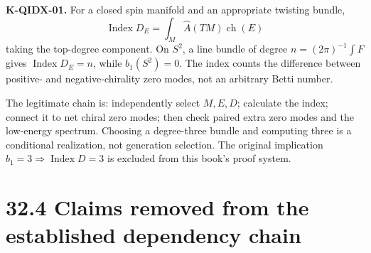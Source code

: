 \documentclass[
  11pt,
  oneside]{book}
\begin{document}
\textbf{K-QIDX-01.} For a closed spin manifold and an appropriate
twisting bundle, \[
\operatorname{Index}D_E=\int_M\widehat A(TM)\operatorname{ch}(E)
\] taking the top-degree component. On \(S^2\), a line bundle of degree
\(n=(2\pi)^{-1}\int F\) gives \(\operatorname{Index}D_E=n\), while
\(b_1(S^2)=0\). The index counts the difference between positive- and
negative-chirality zero modes, not an arbitrary Betti number.

The legitimate chain is: independently select \(M,E,D\); calculate the
index; connect it to net chiral zero modes; then check paired extra zero
modes and the low-energy spectrum. Choosing a degree-three bundle and
computing three is a conditional realization, not generation selection.
The original implication \(b_1=3\Rightarrow\operatorname{Index}D=3\) is
excluded from this book's proof system.

\section{32.4 Claims removed from the established dependency chain}
\end{document}
